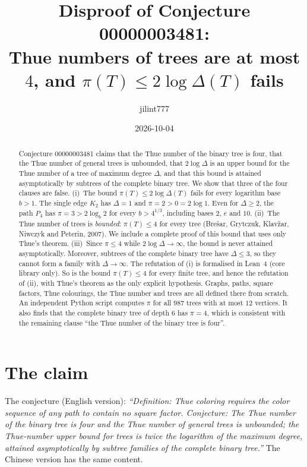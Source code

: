\documentclass[11pt]{article}
\title{Disproof of Conjecture 00000003481:\\
Thue numbers of trees are at most $4$, and $\pi(T)\le 2\log\Delta(T)$ fails}
\author{jilint777}
\date{2026-10-04}
\theoremstyle{definition}
\theoremstyle{remark}
\begin{document}
\sloppy
\maketitle

\begin{abstract}
Conjecture 00000003481 claims that the Thue number of the binary tree is four, that the Thue
number of general trees is unbounded, that $2\log\Delta$ is an upper bound for the Thue number of
a tree of maximum degree $\Delta$, and that this bound is attained asymptotically by subtrees of
the complete binary tree. We show that three of the four clauses are false. (i)~The bound
$\pi(T)\le 2\log\Delta(T)$ fails for every logarithm base $b>1$. The single edge $K_2$ has
$\Delta=1$ and $\pi=2>0=2\log 1$. Even for $\Delta\ge2$, the path $P_4$ has $\pi=3>2\log_b2$ for
every $b>4^{1/3}$, including bases $2$, $e$ and $10$. (ii)~The Thue number of trees is
\emph{bounded}: $\pi(T)\le 4$ for every tree (Bre\v{s}ar, Grytczuk, Klav\v{z}ar, Niwczyk and
Peterin, 2007). We include a complete proof of this bound that uses only Thue's theorem.
(iii)~Since $\pi\le4$ while $2\log\Delta\to\infty$, the bound is never attained asymptotically.
Moreover, subtrees of the complete binary tree have $\Delta\le3$, so they cannot form a family
with $\Delta\to\infty$. The refutation of (i) is formalised in Lean~4 (core library only).
So is the bound $\pi(T)\le4$ for every finite tree, and hence the refutation of (ii), with
Thue's theorem as the only explicit hypothesis. Graphs, paths, square factors, Thue colourings,
the Thue number and trees are all defined there from scratch. An independent Python script computes $\pi$ for all $987$ trees with at most $12$
vertices. It also finds that the complete binary tree of depth $6$ has $\pi=4$, which is
consistent with the remaining clause ``the Thue number of the binary tree is four''.
\end{abstract}

\section{The claim}

The conjecture (English version): \emph{``Definition: Thue coloring requires the color sequence
of any path to contain no square factor. Conjecture: The Thue number of the binary tree is four
and the Thue number of general trees is unbounded; the Thue-number upper bound for trees is twice
the logarithm of the maximum degree, attained asymptotically by subtree families of the complete
binary tree.''} The Chinese version has the same content.
\end{document}
